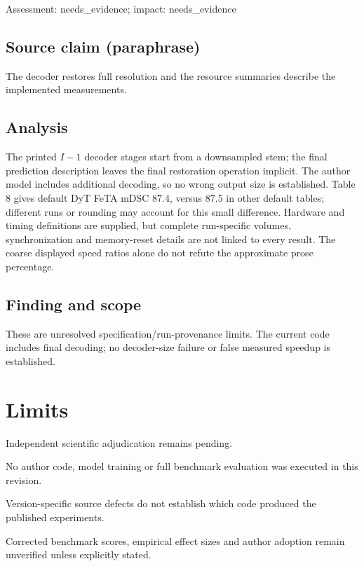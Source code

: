 \documentclass[11pt]{article}
\begin{document}
Assessment: needs\_evidence; impact: needs\_evidence

\subsection*{Source claim (paraphrase)}

The decoder restores full resolution and the resource summaries describe the implemented measurements.

\subsection*{Analysis}

The printed \(I-1\) decoder stages start from a downsampled stem; the final prediction description leaves the final restoration operation implicit. The author model includes additional decoding, so no wrong output size is established. Table 8 gives default DyT FeTA mDSC \(87.4\), versus \(87.5\) in other default tables; different runs or rounding may account for this small difference. Hardware and timing definitions are supplied, but complete run-specific volumes, synchronization and memory-reset details are not linked to every result. The coarse displayed speed ratios alone do not refute the approximate prose percentage.

\subsection*{Finding and scope}

These are unresolved specification/run-provenance limits. The current code includes final decoding; no decoder-size failure or false measured speedup is established.

\section*{Limits}

Independent scientific adjudication remains pending.\par

No author code, model training or full benchmark evaluation was executed in this revision.\par

Version-specific source defects do not establish which code produced the published experiments.\par

Corrected benchmark scores, empirical effect sizes and author adoption remain unverified unless explicitly stated.\par
\end{document}
